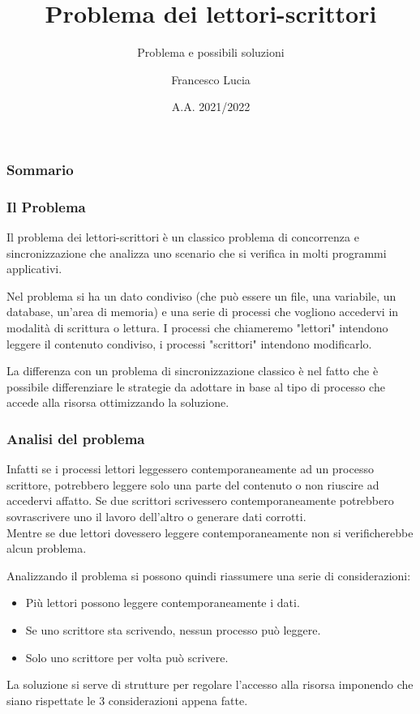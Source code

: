 \documentclass[10pt]{beamer}
\title[Lettori-Scrittori]{Problema dei lettori-scrittori}
\subtitle{Problema e possibili soluzioni}
\author{Francesco Lucia}
\institute[]
{
	Università degli studi della Basilicata \\
	\medskip
}
\date{A.A. 2021/2022}
\begin{document}
	
	\begin{frame}
		\titlepage
	\end{frame}
	
	\begin{frame}
		\frametitle{Sommario}
		\tableofcontents
	\end{frame}
	
	\begin{frame}
		\frametitle{Il Problema}
		
		Il problema dei lettori-scrittori è un classico problema di concorrenza e sincronizzazione che analizza uno scenario che si verifica in molti programmi applicativi.
		
		Nel problema si ha un dato condiviso (che può essere un file, una variabile, un database, un'area di memoria) e una serie di processi che vogliono accedervi in modalità di scrittura o lettura. I processi che chiameremo "lettori" intendono leggere il contenuto condiviso, i processi "scrittori" intendono modificarlo.
	
		La differenza con un problema di sincronizzazione classico è nel fatto che è possibile differenziare le strategie da adottare in base al tipo di processo che accede alla risorsa ottimizzando la soluzione.
	\end{frame}

\begin{frame}
	\frametitle{Analisi del problema}
	
	Infatti se i processi lettori leggessero contemporaneamente ad un processo scrittore, potrebbero leggere solo una parte del contenuto o non riuscire ad accedervi affatto. Se due scrittori scrivessero contemporaneamente potrebbero sovrascrivere uno il lavoro dell'altro o generare dati corrotti.\\Mentre se due lettori dovessero leggere contemporaneamente non si verificherebbe alcun problema.
	
	Analizzando il problema si possono quindi riassumere una serie di considerazioni:
	
	\begin{itemize}
		\item Più lettori possono leggere contemporaneamente i dati.
		\item Se uno scrittore sta scrivendo, nessun processo può leggere.
		\item Solo uno scrittore per volta può scrivere.
	\end{itemize}

	La soluzione si serve di strutture per regolare l'accesso alla risorsa imponendo che siano rispettate le 3 considerazioni appena fatte.
\end{frame}
\end{document}
